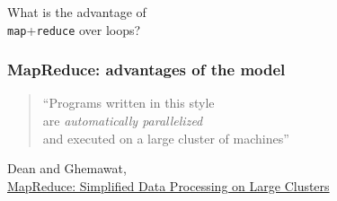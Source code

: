 \documentclass[english,serif,mathserif]{beamer}
\begin{document}
\begin{frame}
  \begin{center}
    {\huge
      What is the advantage of \\
      \texttt{map}+\texttt{reduce} over loops?}

    \+
  \end{center}
\end{frame}


\begin{frame}
  \frametitle{MapReduce: advantages of the model}
  \begin{quote}
    ``Programs written in this style \\ are \emph{automatically
      parallelized} \\ and executed on a large cluster of machines''
  \end{quote}

  \+
  \begin{references}
    Dean and Ghemawat, \\
    \href{http://research.google.com/archive/mapreduce.html}{MapReduce:
      Simplified Data Processing on Large Clusters}
  \end{references}
\end{frame}
\end{document}
